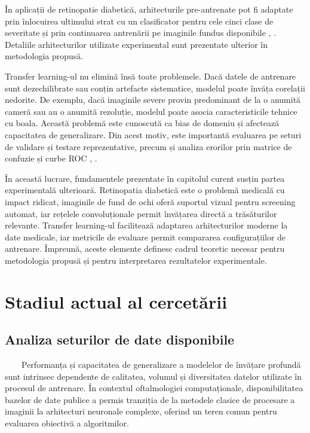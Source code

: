 \documentclass[12pt, a4paper, twoside, romanian]{teza-upb}
\begin{document}
În aplicații de retinopatie diabetică, arhitecturile pre-antrenate pot fi adaptate prin
înlocuirea ultimului strat cu un clasificator pentru cele cinci clase de severitate și
prin continuarea antrenării pe imaginile fundus disponibile \cite{4_pratt2016convolutional}, \cite{10_jabbar2022transfer}. Detaliile arhitecturilor utilizate experimental sunt
prezentate ulterior în metodologia propusă.
\bigskip

Transfer learning-ul nu elimină însă toate problemele. Dacă datele de antrenare sunt
dezechilibrate sau conțin artefacte sistematice, modelul poate învăța corelații nedorite. De exemplu,
dacă imaginile severe provin predominant de la o anumită cameră sau au
o anumită rezoluție, modelul poate asocia caracteristicile tehnice cu boala. Această problemă
este cunoscută ca bias de domeniu și afectează capacitatea de generalizare. Din
acest motiv, este importantă evaluarea pe seturi de validare și testare reprezentative,
precum și analiza erorilor prin matrice de confuzie și curbe ROC \cite{8_zhang2022multi}, \cite{14_liu2022deepdrid}.
\bigskip

În această lucrare, fundamentele prezentate în capitolul curent susțin partea experimentală ulterioară.
Retinopatia diabetică este o problemă medicală cu impact ridicat, imaginile de fund
de ochi oferă suportul vizual pentru screening automat, iar rețelele convoluționale permit
învățarea directă a trăsăturilor relevante. Transfer learning-ul facilitează adaptarea arhitecturilor moderne la
date medicale, iar metricile de evaluare permit compararea configurațiilor de antrenare. Împreună,
aceste elemente definesc cadrul teoretic necesar pentru metodologia propusă și pentru interpretarea
rezultatelor experimentale.


\chapter{Stadiul actual al cercetării}

\section{Analiza seturilor de date disponibile}

\ \ \ \ Performanța și capacitatea de generalizare a modelelor de învățare profundă sunt intrinsec
dependente de calitatea, volumul și diversitatea datelor utilizate în procesul de antrenare. În contextul
oftalmologiei computaționale, disponibilitatea bazelor de date publice a permis tranziția de la metodele
clasice de procesare a imaginii la arhitecturi neuronale complexe, oferind un teren comun pentru
evaluarea obiectivă a algoritmilor.
\end{document}
